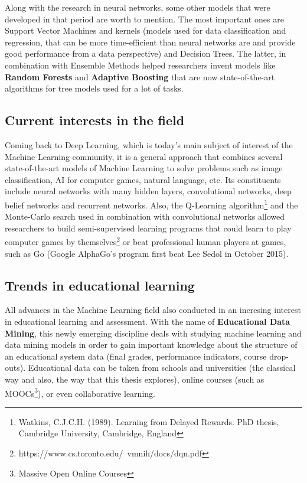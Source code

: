 Along with the research in neural networks, some other models that were developed in that 
period are worth to mention. The most important ones are Support Vector Machines and kernels 
(models used for data classification and regression, that can be more time-efficient 
than neural networks are and provide good performance from a data perspective) and Decision Trees. 
The latter, in combination with Ensemble Methods helped researchers invent models like 
{\bf Random Forests} and {\bf Adaptive Boosting} that are now state-of-the-art 
algorithms for tree models used for a lot of tasks.

\subsection{Current interests in the field}

Coming back to Deep Learning, which is today's main subject of interest of the 
Machine Learning community, it is a general approach that combines several state-of-the-art 
models of Machine Learning to solve problems such as image classification, AI for 
computer games, natural language, etc. Its constituents include neural networks with many 
hidden layers, convolutional networks, deep belief networks and recurrent networks. 
Also, the Q-Learning algorithm\footnote{Watkins, C.J.C.H. (1989). Learning from Delayed Rewards. 
PhD thesis, Cambridge University, Cambridge, England} and the Monte-Carlo search used 
in combination with convolutional networks allowed researchers to build semi-supervised 
learning programs that could learn to play computer games by themselves\footnote
{https://www.cs.toronto.edu/~vmnih/docs/dqn.pdf} or beat professional human players at 
games, such as Go (Google AlphaGo's program first beat Lee Sedol in October 2015). 

\subsection{Trends in educational learning}

All advances in the Machine Learning field also conducted in an incresing interest in 
educational learning and assessment. With the name of {\bf Educational Data Mining}, 
this newly emerging discipline deals with studying machine learning and data mining 
models in order to gain important knowledge about the structure of an educational 
system data (final grades, performance indicators, course drop-outs). Educational 
data can be taken from schools and universities (the classical way and also, the way 
that this thesis explores), online courses (such as MOOCs\footnote{Massive Open 
Online Courses}), or even collaborative learning.

